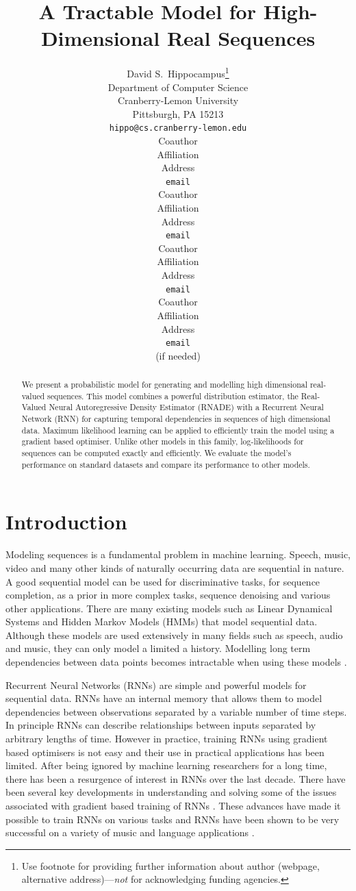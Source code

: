 \documentclass{article} %
\title{A Tractable Model for High-Dimensional Real Sequences}
\author{
David S.~Hippocampus\thanks{ Use footnote for providing further information
about author (webpage, alternative address)---\emph{not} for acknowledging
funding agencies.} \\
Department of Computer Science\\
Cranberry-Lemon University\\
Pittsburgh, PA 15213 \\
\texttt{hippo@cs.cranberry-lemon.edu} \\
\And
Coauthor \\
Affiliation \\
Address \\
\texttt{email} \\
\AND
Coauthor \\
Affiliation \\
Address \\
\texttt{email} \\
\And
Coauthor \\
Affiliation \\
Address \\
\texttt{email} \\
\And
Coauthor \\
Affiliation \\
Address \\
\texttt{email} \\
(if needed)\\
}
\begin{document}
\maketitle

\begin{abstract}
We present a probabilistic model for generating and modelling high dimensional real-valued sequences. This model combines a powerful distribution estimator, the Real-Valued Neural Autoregressive Density Estimator (RNADE) with a Recurrent Neural Network (RNN) for capturing temporal dependencies in sequences of high dimensional data. Maximum likelihood learning can be applied to efficiently train the model using a gradient based optimiser. Unlike other models in this family, log-likelihoods for sequences can be computed exactly and efficiently. We evaluate the model's performance on standard datasets and compare its performance to other models. 
\end{abstract}

\section{Introduction}
\label{intro}
Modeling sequences is a fundamental problem in machine learning. Speech, music, video and many other kinds of naturally occurring data are sequential in nature. A good sequential model can be used for discriminative tasks, for sequence completion, as a prior in more complex tasks, sequence denoising and various other applications. There are many existing models such as Linear Dynamical Systems and Hidden Markov Models (HMMs) that model sequential data. Although these models are used extensively in many fields such as speech, audio and music, they can only model a limited a history. Modelling long term dependencies between data points becomes intractable when using these models \cite{sutskever2007learning}. 

Recurrent Neural Networks (RNNs) are simple and powerful models for sequential data. RNNs have an internal memory that allows them to model dependencies between observations separated by a variable number of time steps. In principle RNNs can describe relationships between inputs separated by arbitrary lengths of time. However in practice, training RNNs using gradient based optimisers is not easy and their use in practical applications has been limited. After being ignored by machine learning researchers for a long time, there has been a resurgence of interest in RNNs over the last decade. There have been several key developments in understanding and solving some of the issues associated with gradient based training of RNNs \cite{Martens2011,bengio2012advances}. These advances have made it possible to train RNNs on various tasks and RNNs have been shown to be very successful on a variety of music and language applications \cite{mikolov2011empirical,Boulanger-Lewandowski2012,bengio2012advances}. 
\end{document}
